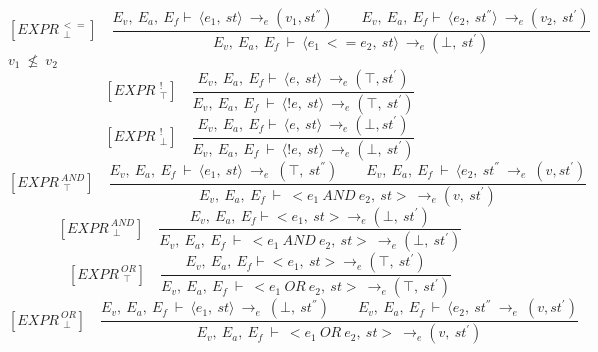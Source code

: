 \[	
[EXPR^{\ <=}_{\ \ \bot}] \quad	
\dfrac{E_v, \ E_a, \ E_f \vdash \ \langle e_1, \ st \rangle \ \rightarrow_e (v_1, st^{''}) \qquad E_v, \ E_a, \ E_f \vdash \ \langle e_2, \ st^{''} \rangle \ \rightarrow_e (v_2, \ st^{'})}{E_v, \ E_a, \ E_f \ \vdash \ \langle e_1 \ <= e_2, \ st \rangle \ \rightarrow_e (\bot, \ st^{'})}	
\]
\begin{math}		
v_1 \ \nleq \ v_2		
\end{math}
\[	
[EXPR^{\ \ !}_{\ \ \top}] \quad	
\dfrac{E_v, \ E_a, \ E_f \vdash \ \langle e, \ st \rangle \ \rightarrow_e (\top, st^{'})}{E_v, \ E_a, \ E_f \ \vdash \ \langle !e, \ st \rangle \ \rightarrow_e (\top, \ st^{'})}	
\] \newline
\[	
[EXPR^{\ \ !}_{\ \ \bot}] \quad	
\dfrac{E_v, \ E_a, \ E_f \vdash \ \langle e, \ st \rangle \ \rightarrow_e (\bot, st^{'})}{E_v, \ E_a, \ E_f \ \vdash \ \langle !e, \ st \rangle \ \rightarrow_e (\bot, \ st^{'})}	
\]\newline
\[	
[EXPR^{\ AND}_{\ \ \top}] \quad	
\dfrac{E_v, \ E_a, \ E_f \ \vdash \ \langle e_1, \ st \rangle \ \rightarrow_e \ (\top, \ st^{''}) \qquad E_v, \ E_a, \ E_f \ \vdash \ \langle e_2, \ st^{''} \ \rightarrow_e \ (v, st^{'})}{E_v, \ E_a, \ E_f \ \vdash \ <e_1 \ AND \ e_2, \ st> \ \rightarrow_e (v, \ st^{'})}	
\] \newline
\[	
[EXPR^{\ AND}_{\ \ \bot}] \quad	
\dfrac{E_v, \ E_a, \ E_f \vdash <e_1, \ st> \rightarrow_e (\bot, \ st^{'}) }{E_v, \ E_a, \ E_f \ \vdash \ <e_1 \ AND \ e_2, \ st> \ \rightarrow_e (\bot, \ st^{'})}	
\]\newline
\[	
[EXPR^{\ OR}_{\ \ \top}] \quad	
\dfrac{E_v, \ E_a, \ E_f \vdash <e_1, \ st> \rightarrow_e (\top, \ st^{'}) }{E_v, \ E_a, \ E_f \ \vdash \ <e_1 \ OR \ e_2, \ st> \ \rightarrow_e (\top, \ st^{'})}	
\]\newline
\[	
[EXPR^{\ OR}_{\ \ \bot}] \quad	
\dfrac{E_v, \ E_a, \ E_f \ \vdash \ \langle e_1, \ st \rangle \ \rightarrow_e \ (\bot, \ st^{''}) \qquad E_v, \ E_a, \ E_f \ \vdash \ \langle e_2, \ st^{''} \ \rightarrow_e \ (v, st^{'})}{E_v, \ E_a, \ E_f \ \vdash \ <e_1 \ OR \ e_2, \ st> \ \rightarrow_e (v, \ st^{'})}
\]